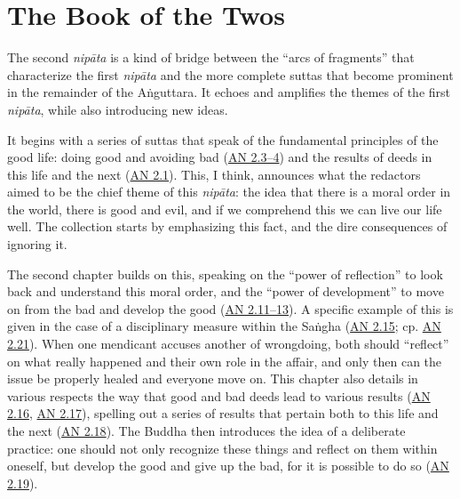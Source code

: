 \documentclass[12pt,openany]{book}%
\begin{document}
\section*{The Book of the Twos}

The second \textit{\textsanskrit{nipāta}} is a kind of bridge between the “arcs of fragments” that characterize the first \textit{\textsanskrit{nipāta}} and the more complete suttas that become prominent in the remainder of the \textsanskrit{Aṅguttara}. It echoes and amplifies the themes of the first \textit{\textsanskrit{nipāta}}, while also introducing new ideas.

It begins with a series of suttas that speak of the fundamental principles of the good life: doing good and avoiding bad (\href{https://suttacentral.net/an2.1{-}10}{AN 2.3–4}) and the results of deeds in this life and the next (\href{https://suttacentral.net/an2.1{-}10}{AN 2.1}). This, I think, announces what the redactors aimed to be the chief theme of this \textit{\textsanskrit{nipāta}}: the idea that there is a moral order in the world, there is good and evil, and if we comprehend this we can live our life well. The collection starts by emphasizing this fact, and the dire consequences of ignoring it.

The second chapter builds on this, speaking on the “power of reflection” to look back and understand this moral order, and the “power of development” to move on from the bad and develop the good (\href{https://suttacentral.net/an2.11{-}20}{AN 2.11–13}). A specific example of this is given in the case of a disciplinary measure within the \textsanskrit{Saṅgha} (\href{https://suttacentral.net/an2.11{-}20}{AN 2.15}; cp. \href{https://suttacentral.net/an2.21{-}31}{AN 2.21}). When one mendicant accuses another of wrongdoing, both should “reflect” on what really happened and their own role in the affair, and only then can the issue be properly healed and everyone move on. This chapter also details in various respects the way that good and bad deeds lead to various results (\href{https://suttacentral.net/an2.11{-}20}{AN 2.16}, \href{https://suttacentral.net/an2.11{-}20}{AN 2.17}), spelling out a series of results that pertain both to this life and the next (\href{https://suttacentral.net/an2.11{-}20}{AN 2.18}). The Buddha then introduces the idea of a deliberate practice: one should not only recognize these things and reflect on them within oneself, but develop the good and give up the bad, for it is possible to do so (\href{https://suttacentral.net/an2.11{-}20}{AN 2.19}).
\end{document}
